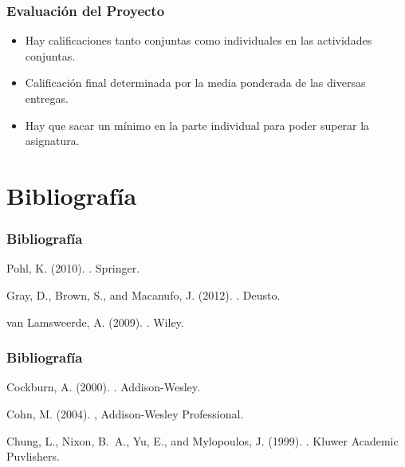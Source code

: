 \documentclass[a4paper,slidestop,xcolor=pst,dvips,blue]{beamer}
\begin{document}
\begin{frame}[c]
	\frametitle{Evaluación del Proyecto}
	\begin{itemize}[<+->]
        \item Hay calificaciones tanto conjuntas como individuales en las actividades conjuntas.
        \item Calificación final determinada por la media ponderada de las diversas entregas.
        \item Hay que sacar un mínimo en la parte individual para poder superar la asignatura. 
	\end{itemize}
\end{frame}

\section{Bibliografía}

\begin{frame}[c]
	\frametitle{Bibliografía}
\begin{thebibliography}{}

Pohl, K. (2010).
.
\newblock Springer.

Gray, D., Brown, S., and Macanufo, J. (2012).
.
\newblock Deusto.

van Lamsweerde, A. (2009).
.
\newblock Wiley.

\end{thebibliography}
\end{frame}

\begin{frame}[c]
	\frametitle{Bibliografía}
\begin{thebibliography}{}

Cockburn, A. (2000).
.
\newblock Addison-Wesley.

Cohn, M. (2004).
,
\newblock Addison-Wesley Professional.

Chung, L., Nixon, B.~A., Yu, E., and Mylopoulos, J. (1999).
.
\newblock Kluwer Academic Puvlishers.

\end{thebibliography}

\end{frame}
\end{document}
